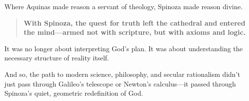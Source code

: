 Where Aquinas made reason a servant of theology,  
Spinoza made reason divine.

\begin{quote}
\textbf{With Spinoza, the quest for truth left the cathedral and entered the mind—armed not with scripture, but with axioms and logic.}
\end{quote}

It was no longer about interpreting God’s plan. It was about understanding the necessary structure of reality itself.

And so, the path to modern science, philosophy, and secular rationalism didn’t just pass through Galileo’s telescope or Newton’s calculus—it passed through Spinoza’s quiet, geometric redefinition of God.
